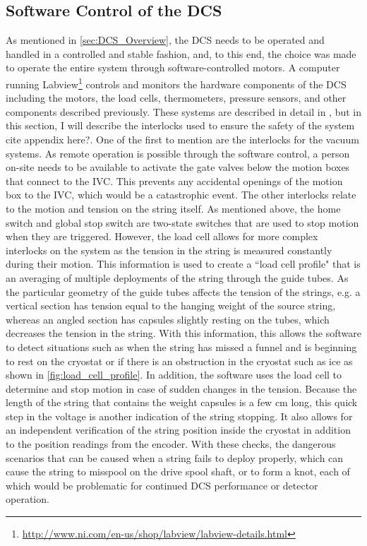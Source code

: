 \subsection*{Software Control of the DCS}
\label{ssec:Software Control of the DCS}
As mentioned in \autoref{sec:DCS_Overview}, the DCS needs to be operated and handled in a controlled and stable fashion, and, to this end, the choice was made to operate the entire system through software-controlled motors.
A computer running Labview\footnote{\RaggedRight\url{http://www.ni.com/en-us/shop/labview/labview-details.html}} controls and monitors the hardware components of the DCS including the motors, the load cells, thermometers, pressure sensors, and other components described previously.
These systems are described in detail in \cite{JeremyThesis}, but in this section, I will describe the interlocks used to ensure the safety of the system \color{red}cite appendix here?\color{black}.
One of the first to mention are the interlocks for the vacuum systems.
As remote operation is possible through the software control, a person on-site needs to be available to activate the gate valves below the motion boxes that connect to the IVC.
This prevents any accidental openings of the motion box to the IVC, which would be a catastrophic event.
The other interlocks relate to the motion and tension on the string itself.
As mentioned above, the home switch and global stop switch are two-state switches that are used to stop motion when they are triggered.
However, the load cell allows for more complex interlocks on the system as the tension in the string is measured constantly during their motion.
This information is used to create a ``load cell profile" that is an averaging of multiple deployments of the string through the guide tubes.
As the particular geometry of the guide tubes affects the tension of the strings, e.g. a vertical section has tension equal to the hanging weight of the source string, whereas an angled section has capsules slightly resting on the tubes, which decreases the tension in the string.
With this information, this allows the software to detect situations such as when the string has missed a funnel and is beginning to rest on the cryostat or if there is an obstruction in the cryostat such as ice as shown in \autoref{fig:load_cell_profile}.
In addition, the software uses the load cell to determine and stop motion in case of sudden changes in the tension.
Because the length of the string that contains the weight capsules is a few cm long, this quick step in the voltage is another indication of the string stopping. 
It also allows for an independent verification of the string position inside the cryostat in addition to the position readings from the encoder.
With these checks, the dangerous scenarios that can be caused when a string fails to deploy properly, which can cause the string to misspool on the drive spool shaft, or to form a knot, each of which would be problematic for continued DCS performance or detector operation.

